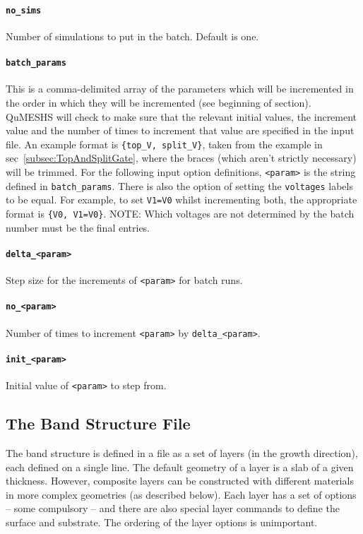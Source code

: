 \documentclass[12pt]{article}
\begin{document}
\paragraph{\texttt{no\_sims}}
Number of simulations to put in the batch.  Default is one.

\paragraph{\texttt{batch\_params}}
This is a comma-delimited array of the parameters which will be incremented in the
order in which they will be incremented (see beginning of section).  QuMESHS will
check to make sure that the relevant initial values, the increment value and the
number of times to increment that value are specified in the input file.  An example
format is \texttt{\{top\_V, split\_V\}}, taken from the example in
sec~\ref{subsec:TopAndSplitGate}, where the braces (which aren't strictly necessary)
will be trimmed.  For the following input option definitions, \texttt{<param>} is the
string defined in \texttt{batch\_params}.  There is also the option of setting the
\texttt{voltages} labels to be equal.  For example, to set \texttt{V1=V0} whilst
incrementing both, the appropriate format is \texttt{\{V0, V1=V0\}}.  {\color{red} NOTE:}
Which voltages are not determined by the batch number must be the final entries.

\paragraph{\texttt{delta\_<param>}}
Step size for the increments of \texttt{<param>} for batch runs.

\paragraph{\texttt{no\_<param>}}
Number of times to increment \texttt{<param>} by \texttt{delta\_<param>}.

\paragraph{\texttt{init\_<param>}}
Initial value of \texttt{<param>} to step from.


\subsection{The Band Structure File}
\label{subsec:BandStructureFile}

The band structure is defined in a file as a set of layers (in the growth direction), each
defined on a single line.  The default geometry of a layer is a slab of a given thickness.
However, composite layers can be constructed with different materials in more complex
geometries (as described below).  Each layer has a set of options -- some compulsory --
and there are also special layer commands to define the surface and substrate.  The
ordering of the layer options is unimportant.
\end{document}
